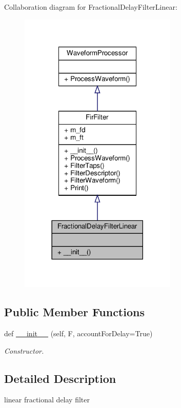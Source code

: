 Collaboration diagram for Fractional\+Delay\+Filter\+Linear\+:\nopagebreak
\begin{figure}[H]
\begin{center}
\leavevmode
\includegraphics[width=213pt]{classSignalIntegrity_1_1TimeDomain_1_1Filters_1_1InterpolatorLinear_1_1FractionalDelayFilterLinear__coll__graph}
\end{center}
\end{figure}
\subsection*{Public Member Functions}
\begin{DoxyCompactItemize}
\item 
def \hyperlink{classSignalIntegrity_1_1TimeDomain_1_1Filters_1_1InterpolatorLinear_1_1FractionalDelayFilterLinear_a71162faa904c7ea2018b89ebba16c33d}{\+\_\+\+\_\+init\+\_\+\+\_\+} (self, F, account\+For\+Delay=True)
\begin{DoxyCompactList}\small\item\em Constructor. \end{DoxyCompactList}\end{DoxyCompactItemize}


\subsection{Detailed Description}
linear fractional delay filter 

